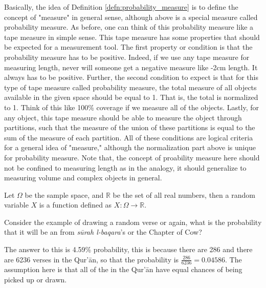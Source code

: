Basically, the idea of Definition \ref{defn:probability_measure} is to define the concept of "measure" in general sense, although above is a special measure called probability measure. As before, one can think of this probability measure like a tape measure in simple sense. This tape measure has some properties that should be expected for a measurement tool. The first property or condition is that the probability measure has to be positive. Indeed, if we use any tape measure for measuring length, never will someone get a negative measure like -2cm length. It always has to be positive. Further, the second condition to expect is that for this type of tape measure called probability measure, the total measure of all objects available in the given space should be equal to 1. That is, the total is normalized to 1. Think of this like 100\% coverage if we measure all of the objects. Lastly, for any object, this tape measure should be able to measure the object through partitions, such that the measure of the union of these partitions is equal to the sum of the measure of each partition. All of these conditions are logical criteria for a general idea of "measure," although the normalization part above is unique for probability measure. Note that, the concept of proability measure here should not be confined to measuring length as in the analogy, it should generalize to measuring volume and complex objects in general.
\begin{defn}
Let $\Omega$ be the sample space, and $\mathbb{R}$ be the set of all real numbers, then a random variable $X$ is a function defined as $X:\Omega\rightarrow\mathbb{R}$.
\end{defn}
\begin{exmp}\label{ex:ayah_prob}
Consider the example of drawing a random verse or   again, what is the probability that it will be an   from \textit{s\=urah l-baqara}'s   or the Chapter of Cow?

The answer to this is 4.59\% probability, this is because there are 286   and there are 6236 verses in the Qur'\=an, so that the probability is $\frac{286}{6236}=0.04586$. The assumption here is that all of the   in the Qur'\=an have equal chances of being picked up or drawn.

\end{exmp}
